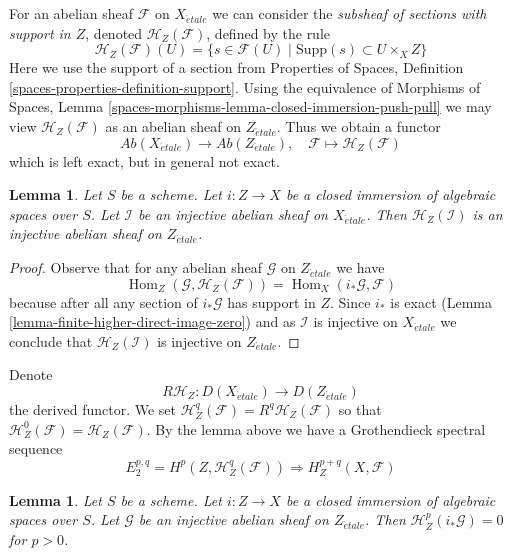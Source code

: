 \documentclass{stacks-project}
\theoremstyle{plain}
\newtheorem{lemma}[subsection]{Lemma}
\theoremstyle{definition}
\theoremstyle{remark}
\numberwithin{equation}{subsection}
\def\Hom{\mathop{\mathrm{Hom}}\nolimits}
\def\etale{{\acute{e}tale}}
\begin{document}
\medskip\noindent
For an abelian sheaf $\mathcal{F}$ on $X_\etale$ we can consider
the {\it subsheaf of sections with support in $Z$}, denoted
$\mathcal{H}_Z(\mathcal{F})$, defined by the rule
$$
\mathcal{H}_Z(\mathcal{F})(U) =
\{s \in \mathcal{F}(U) \mid \text{Supp}(s) \subset U \times_X Z\}
$$
Here we use the support of a section from
Properties of Spaces, Definition \ref{spaces-properties-definition-support}.
Using the equivalence of Morphisms of Spaces, Lemma
\ref{spaces-morphisms-lemma-closed-immersion-push-pull}
we may view $\mathcal{H}_Z(\mathcal{F})$ as an abelian sheaf on
$Z_\etale$. Thus we obtain a functor
$$
\textit{Ab}(X_\etale) \longrightarrow \textit{Ab}(Z_\etale),\quad
\mathcal{F} \longmapsto \mathcal{H}_Z(\mathcal{F})
$$
which is left exact, but in general not exact.

\begin{lemma}
\label{lemma-sections-with-support-acyclic}
Let $S$ be a scheme.
Let $i : Z \to X$ be a closed immersion of algebraic spaces over $S$.
Let $\mathcal{I}$ be an injective abelian sheaf on $X_\etale$.
Then $\mathcal{H}_Z(\mathcal{I})$ is an injective abelian sheaf
on $Z_\etale$.
\end{lemma}

\begin{proof}
Observe that for any abelian sheaf $\mathcal{G}$ on $Z_\etale$
we have
$$
\Hom_Z(\mathcal{G}, \mathcal{H}_Z(\mathcal{F})) =
\Hom_X(i_*\mathcal{G}, \mathcal{F})
$$
because after all any section of $i_*\mathcal{G}$ has support in $Z$.
Since $i_*$ is exact (Lemma \ref{lemma-finite-higher-direct-image-zero})
and as $\mathcal{I}$ is injective on $X_\etale$ we conclude that
$\mathcal{H}_Z(\mathcal{I})$ is injective on $Z_\etale$.
\end{proof}

\noindent
Denote
$$
R\mathcal{H}_Z : D(X_\etale) \longrightarrow D(Z_\etale)
$$
the derived functor. We set
$\mathcal{H}^q_Z(\mathcal{F}) = R^q\mathcal{H}_Z(\mathcal{F})$ so that
$\mathcal{H}^0_Z(\mathcal{F}) = \mathcal{H}_Z(\mathcal{F})$.
By the lemma above we have a Grothendieck spectral sequence
$$
E_2^{p, q} = H^p(Z, \mathcal{H}^q_Z(\mathcal{F}))
\Rightarrow H^{p + q}_Z(X, \mathcal{F})
$$

\begin{lemma}
\label{lemma-cohomology-with-support-sheaf-on-support}
Let $S$ be a scheme. Let $i : Z \to X$ be a closed immersion of
algebraic spaces over $S$. Let $\mathcal{G}$ be an injective abelian
sheaf on $Z_\etale$. Then $\mathcal{H}^p_Z(i_*\mathcal{G}) = 0$ for $p > 0$.
\end{lemma}
\end{document}
